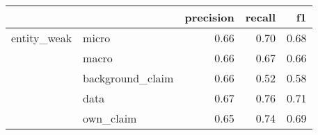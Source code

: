 \begin{tabular}{llrrr}
\toprule
            &           &  precision &  recall &   f1 \\
\midrule
entity\_weak & micro &       0.66 &    0.70 & 0.68 \\
            & macro &       0.66 &    0.67 & 0.66 \\
            & background\_claim &       0.66 &    0.52 & 0.58 \\
            & data &       0.67 &    0.76 & 0.71 \\
            & own\_claim &       0.65 &    0.74 & 0.69 \\
\bottomrule
\end{tabular}
